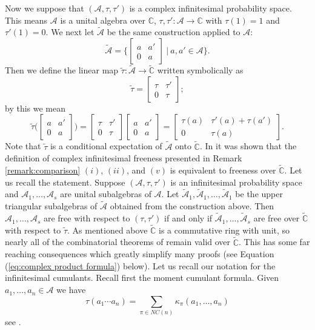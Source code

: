 \documentclass[11pt]{amsart}
\theoremstyle{definition}
\numberwithin{theorem}{section}
\newcommand{\bC}{\mathbb{C}}
\newcommand{\tC}{{\widetilde{\mathbb{C}}}}
\newcommand{\ttau}{\tilde{\tau}}
\newcommand{\cA}{\mathcal{A}}
\newcommand{\tA}{\tilde{\cA}}
\newcommand{\NC}{\mathit{NC}}
\begin{document}
Now we suppose that $(\cA, \tau, \tau')$ is a complex
infinitesimal probability space. This means $\cA$ is a
unital algebra over $\bC$, $\tau, \tau': \cA \to \bC$ with
$\tau(1) = 1$ and $\tau'(1) = 0$. We next let $\tA$ be the
same construction applied to $\cA$:
\[
\tA = \bigg\{\begin{bmatrix} a & a' \\ 0 & a \end{bmatrix}
\ \bigg\vert\ a, a' \in \cA \bigg\}.
\]
Then we define the linear map $\ttau: \tA \rightarrow \tC$
written symbolically as
\[
\ttau = \begin{bmatrix} \tau & \tau' \\ 0 & \tau \end{bmatrix};
\]
by this we mean
\[
\ttau \bigg(\begin{bmatrix} a & a' \\ 0 & a \end{bmatrix}
\bigg) = \begin{bmatrix} \tau & \tau' \\ 0 &
  \tau \end{bmatrix} \begin{bmatrix} a & a' \\ 0 &
  a \end{bmatrix} =
\begin{bmatrix} \tau(a) & \tau'(a) + \tau(a') \\ 0 & \tau(a) \end{bmatrix}.
\]
Note that $\ttau$ is a conditional expectation of $\tA$ onto
$\tC$.  In \cite{t} it was shown that the definition of
complex infinitesimal freeness presented in Remark
\ref{remark:comparison} $(i)$, $(ii)$, and $(v)$ is
equivalent to freeness over $\tC$. Let us recall the
statement. Suppose $(\cA, \tau, \tau')$ is an infinitesimal
probability space and $\cA_1, \dots, \cA_s$ are unital
subalgebras of $\cA$. Let $\tilde{\cA}_1, \tilde{\cA}_1,
\dots, \tilde{\cA}_1$ be the upper triangular subalgebras of
$\tA$ obtained from the construction above. Then $\cA_1,
\dots, \cA_s$ are free with respect to $(\tau, \tau')$ if
and only if $\tilde{\cA}_1, \dots, \tilde{\cA}_s$ are free
over $\tC$ with respect to $\ttau$. As mentioned above $\tC$
is a commutative ring with unit, so nearly all of the
combinatorial theorems of \cite{ns} remain valid over
$\tC$. This has some far reaching consequences which greatly
simplify many proofs (see Equation (\ref{eq:complex product
  formula}) below). Let us recall our notation for the
infinitesimal cumulants. Recall first the moment cumulant
formula. Given $a_1, \dots, a_n \in \cA$ we have
\begin{equation}\label{eq:moment_cumulant}
\tau(a_1 \cdots a_n)
=
\sum_{\pi \in \NC(n)} \kappa_\pi(a_1, \dots, a_n)
\end{equation}
see \cite[Lecture 11]{ns}. 
\end{document}
